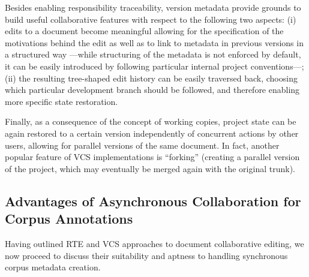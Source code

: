 \documentclass{sig-alternate}
\begin{document}
Besides enabling responsibility traceability, version metadata provide grounds to build useful
collaborative features with respect to the following two aspects: (i) edits to a document become
meaningful allowing for the specification of the motivations behind the edit as well as to link
to metadata in previous versions in a structured way ---while structuring of the metadata
is not enforced by default, it can be easily introduced by following particular internal project
conventions---; (ii) the resulting tree-shaped edit history can be easily traversed back, choosing
which particular development branch should be followed, and therefore enabling more specific
state restoration.

Finally, as a consequence of the concept of working copies, project state can be again restored
to a certain version independently of concurrent actions by other users, allowing for parallel
versions of the same document. In fact, another popular feature of VCS implementations
is ``forking'' (creating a parallel version of the project, which may eventually be merged
again with the original trunk).




\subsection{Advantages of Asynchronous Collaboration for Corpus Annotations}
\label{subsec:hybrid}

Having outlined RTE and VCS approaches to document collaborative editing, we now proceed to discuss
their suitability and aptness to handling synchronous corpus metadata creation.
\end{document}
